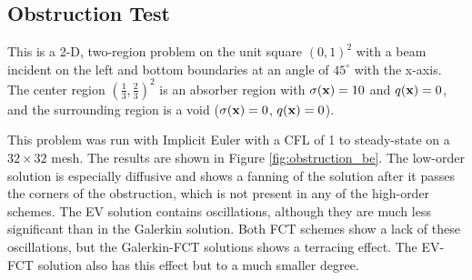 \subsection{Obstruction Test}\label{sec:obstruction}
This is a 2-D, two-region problem on the unit square $(0,1)^2$ with a beam incident on the
left and bottom boundaries at an angle of $45^\circ$ with the x-axis. The
center region $(\frac{1}{3},\frac{2}{3})^2$ is an absorber region
with $\sigma(\mathbf{x})=10$ and $q(\mathbf{x})=0$, and the surrounding region is a void
($\sigma(\mathbf{x})=0$, $q(\mathbf{x})=0$).

This problem was run with Implicit Euler with a CFL of 1 to steady-state on
a $32\times32$ mesh. The results are shown in Figure \ref{fig:obstruction_be}.
The low-order solution is especially diffusive and shows a fanning
of the solution after it passes the corners of the obstruction, which is
not present in any of the high-order schemes. The EV solution contains
oscillations, although they are much less significant than in the Galerkin
solution. Both FCT schemes show a lack of these oscillations, but the
Galerkin-FCT solutions shows a terracing effect. The EV-FCT solution also
has this effect but to a much smaller degree.

